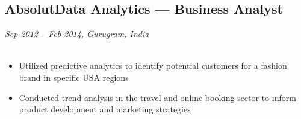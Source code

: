\subsection*{AbsolutData Analytics — Business Analyst}
\textit{Sep 2012 – Feb 2014, Gurugram, India}
\\
\\
\begin{itemize}[leftmargin=1em]
    \item Utilized predictive analytics to identify potential customers for a fashion brand in specific USA regions
    \item Conducted trend analysis in the travel and online booking sector to inform product development and marketing strategies
\end{itemize}
